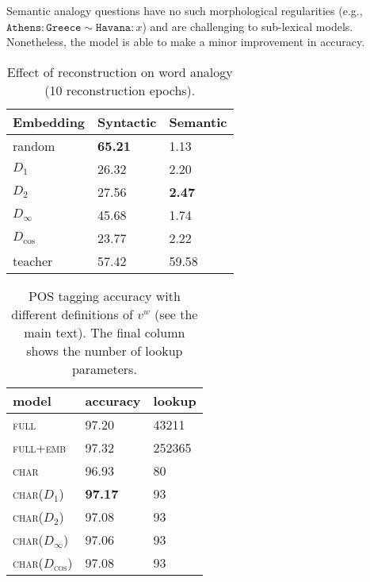 \documentclass[11pt,letterpaper,UTF8]{article}
\begin{document}
\begin{CJK}{UTF8}{gbsn}
Semantic analogy questions have no such morphological regularities (e.g., $\texttt{Athens}:\texttt{Greece}\sim\texttt{Havana}:x$)
and are challenging to sub-lexical models. Nonetheless, the model is able to make a minor improvement in accuracy.

\begin{table}[t!]
\begin{center}
{
\begin{tabular}{|l|l|l|}
\hline
Embedding                           &   Syntactic     &  Semantic \\
\hline
random                             &  \textbf{65.21} &  1.13     \\
$D_1$                              &   26.32         &  2.20     \\
$D_2$                              &   27.56         &  \textbf{2.47}     \\
$D_\infty$                          &   45.68         &  1.74     \\
$D_{\cos{}}$                        &   23.77         &  2.22     \\
\hline
teacher                            &   57.42         &  59.58    \\
\hline
\end{tabular}
\caption{Effect of reconstruction on word analogy (10 reconstruction epochs).}
\label{tab:analogy}
}
\end{center}
\vspace{-1mm}
\end{table}


\begin{table}[t!]
\begin{center}
{
\begin{tabular}{|l|l|l|}
\hline
model                          &   accuracy  & lookup \\
\hline
\textsc{full}                  &   97.20     & 43211  \\
\textsc{full+emb}              &   97.32     & 252365 \\
\hline
\textsc{char}                  &   96.93     &  80   \\
\textsc{char($D_1$)}           &   \textbf{97.17}  &  93        \\
\textsc{char($D_2$)}           &   97.08    & 93      \\
\textsc{char($D_{\infty}$)}     &   97.06     & 93     \\
\textsc{char($D_{\cos}$)}       &   97.08     & 93     \\
\hline
\end{tabular}
\caption{POS tagging accuracy with different definitions of $v^w$ (see the main text).
The final column shows the number of lookup parameters.}
\label{tab:pos}
}
\end{center}
\vspace{-1mm}
\end{table}



\end{CJK}
\end{document}
